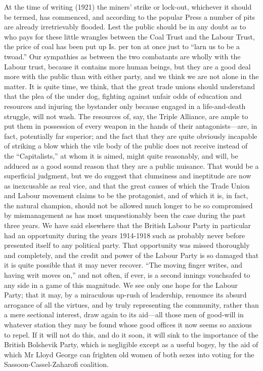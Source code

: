 \documentclass{book}
\begin{document}
At the time of writing (1921) the miners’ strike or lock-out, whichever it should be termed, has commenced, and according to the popular Press a number of pits are already irretrievably flooded. Lest the public should be in any doubt as to who pays for these little wrangles between the Coal Trust and the Labour Trust, the price of coal has been put up Is. per ton at once just to “larn us to be a twoad.” Our sympathies as between the two combatants are wholly with the Labour trust, because it contains more human beings, but they are a good deal more with the public than with either party, and we think we are not alone in the matter. It is quite time, we think, that the great trade unions should understand that the plea of the under dog, fighting against unfair odds of education and resources and injuring the bystander only because engaged in a life-and-death struggle, will not wash. The resources of, say, the Triple Alliance, are ample to put them in possession of every weapon in the hands of their antagonists—are, in fact, potentially far superior; and the fact that they are quite obviously incapable of striking a blow which the vile body of the public does not receive instead of the “Capitalists,” at whom it is aimed, might quite reasonably, and will, be adduced as a good sound reason that they are a public nuisance. That would be a superficial judgment, but we do suggest that clumsiness and ineptitude are now as inexcusable as real vice, and that the great causes of which the Trade Union and Labour movement claims to be the protagonist, and of which it is, in fact, the natural champion, should not be allowed much longer to be so compromised by mismanagement as has most unquestionably been the case during the past three years. We have said elsewhere that the British Labour Party in particular had an opportunity during the years 1914-1918 such as probably never before presented itself to any political party. That opportunity was missed thoroughly and completely, and the credit and power of the Labour Party is so damaged that it is quite possible that it may never recover. “The moving finger writes, and having writ moves on,” and not often, if ever, is a second innings vouchsafed to any side in a game of this magnitude. We see only one hope for the Labour Party; that it may, by a miraculous up-rush of leadership, renounce its absurd arrogance of all the virtues, and by truly representing the community, rather than a mere sectional interest, draw again to its aid—all those men of good-will in whatever station they may be found whose good offices it now seems so anxious to repel. If it will not do this, and do it soon, it will sink to the importance of the British Bolshevik Party, which is negligible except as a useful bogey, by the aid of which Mr Lloyd George can frighten old women of both sexes into voting for the Sassoon-Cassel-Zaharofi coalition.
\end{document}
